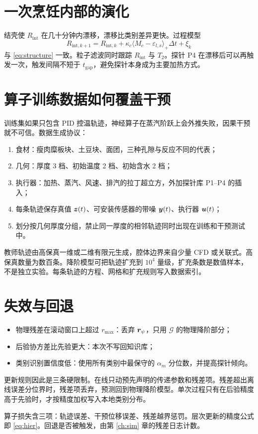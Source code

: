 \section{一次烹饪内部的演化}

结壳使 $R_{\mathrm{int}}$ 在几十分钟内漂移，漂移比类别差异更快。过程模型
\begin{equation}
R_{\mathrm{int},k+1}=R_{\mathrm{int},k}+\kappa_c\langle M_c-\varepsilon_{l,s}\rangle_+\Delta t+\xi_k
\end{equation}
与 \eqref{eq:structure} 一致。粒子滤波同时跟踪 $R_{\mathrm{int}}$ 与 $T_2$。探针 P4 在漂移后可以再触发一次，触发间隔不短于 $t_{\mathrm{gap}}$，避免探针本身成为主要加热方式。

\section{算子训练数据如何覆盖干预}

训练集如果只包含 PID 控温轨迹，神经算子在蒸汽阶跃上会外推失败，因果干预就不可信。数据生成协议：

\begin{enumerate}
\item 食材：瘦肉糜板块、土豆块、面团，三种孔隙与反应不同的代表；
\item 几何：厚度 3 档、初始温度 2 档、初始含水 2 档；
\item 执行器：加热、蒸汽、风速、排汽的拉丁超立方，外加探针库 P1--P4 的插入；
\item 每条轨迹保存真值 $\bm{z}(t)$、可安装传感器的带噪 $\bm{y}(t)$、执行器 $\bm{u}(t)$；
\item 划分按几何厚度分组，禁止同一厚度的相邻轨迹同时出现在训练和干预测试中。
\end{enumerate}

教师轨迹由高保真一维或二维有限元生成，腔体边界来自少量 CFD 或关联式。高保真数量为数百条。降阶模型可把轨迹扩充到 $10^4$ 量级，扩充条数是数值样本，不是独立实验。每条轨迹的方程、网格和扩充规则写入数据索引。

\section{失效与回退}

\begin{itemize}
\item 物理残差在滚动窗口上超过 $r_{\max}$：丢弃 $\bm{r}_{\psi}$，只用 $\mathcal{G}$ 的物理降阶部分；
\item 后验协方差比先验更大：本次不写回知识库；
\item 类别识别置信度低：使用所有类别中最保守的 $\alpha_m$ 分位数，并提高探针倾向。
\end{itemize}

更新规则因此是三条硬限制。在线只动预先声明的传递参数和残差项。残差超出离线误差分位界时，残差项丢弃，预测回到物理降阶模型。单次过程只有在后验精度高于先验时，才按精度加权写入本地类别分布。

算子损失含三项：轨迹误差、干预位移误差、残差越界惩罚。层次更新的精度公式即 \eqref{eq:hier}。回退是否被触发，由第 \ref{ch:sim} 章的残差日志计数。
